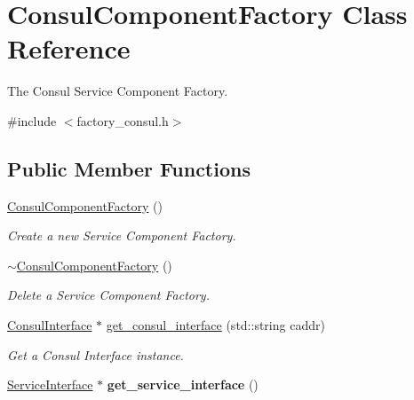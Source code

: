 \hypertarget{classConsulComponentFactory}{}\section{Consul\+Component\+Factory Class Reference}
\label{classConsulComponentFactory}


The Consul Service Component Factory.  




{\ttfamily \#include $<$factory\+\_\+consul.\+h$>$}

\subsection*{Public Member Functions}
\begin{DoxyCompactItemize}
\item 
\hyperlink{classConsulComponentFactory_aa0e7b5fc608732fb0e32c32031d88ddb}{Consul\+Component\+Factory} ()\hypertarget{classConsulComponentFactory_aa0e7b5fc608732fb0e32c32031d88ddb}{}\label{classConsulComponentFactory_aa0e7b5fc608732fb0e32c32031d88ddb}

\begin{DoxyCompactList}\small\item\em Create a new Service Component Factory. \end{DoxyCompactList}\item 
\hyperlink{classConsulComponentFactory_a63d094682e1f45cfb39a13c9da3bcf9c}{$\sim$\+Consul\+Component\+Factory} ()\hypertarget{classConsulComponentFactory_a63d094682e1f45cfb39a13c9da3bcf9c}{}\label{classConsulComponentFactory_a63d094682e1f45cfb39a13c9da3bcf9c}

\begin{DoxyCompactList}\small\item\em Delete a Service Component Factory. \end{DoxyCompactList}\item 
\hyperlink{classConsulInterface}{Consul\+Interface} $\ast$ \hyperlink{classConsulComponentFactory_a4df548f8d48a35b75aa98cf3ff5bafe6}{get\+\_\+consul\+\_\+interface} (std\+::string caddr)\hypertarget{classConsulComponentFactory_a4df548f8d48a35b75aa98cf3ff5bafe6}{}\label{classConsulComponentFactory_a4df548f8d48a35b75aa98cf3ff5bafe6}

\begin{DoxyCompactList}\small\item\em Get a Consul Interface instance. \end{DoxyCompactList}\item 
\hyperlink{classServiceInterface}{Service\+Interface} $\ast$ {\bfseries get\+\_\+service\+\_\+interface} ()\hypertarget{classConsulComponentFactory_a926fac610c9297815e0a064bc47f7c6d}{}\label{classConsulComponentFactory_a926fac610c9297815e0a064bc47f7c6d}


\end{DoxyCompactItemize}
